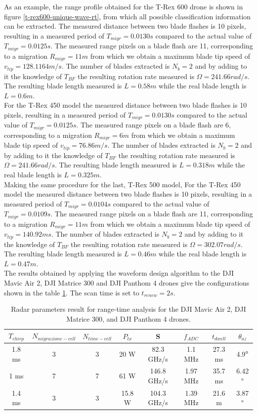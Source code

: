 As an example, the range profile obtained for the T-Rex 600 drone is shown in figure \ref{t-rex600-unique-wave-rt}, from which all possible classification information can be extracted. The measured distance between two blade flashes is 10 pixels, resulting in a measured period of $T_{migr} = 0.0130s$ compared to the actual value of $T_{migr} = 0.0125s$. The measured range pixels on a blade flash are 11, corresponding to a migration $R_{migr}=11m$ from which we obtain a maximum blade tip speed of $v_{tip} = 128.1164 m/s$. The  number of blades extracted is $N_b = 2$ and by adding to it the knowledge of $T_{BF}$ the resulting rotation rate measured is $\Omega = 241.66 rad/s$. The resulting blade length measured is $L = 0.58 m$ while the real blade length is $ L = 0.6 m$. \\
For the T-Rex 450 model the measured distance between two blade flashes is 10 pixels, resulting in a measured period of $T_{migr} = 0.0130s$ compared to the actual value of $T_{migr} = 0.0125s$. The measured range pixels on a blade flash are 6, corresponding to a migration $R_{migr}=6m$ from which we obtain a maximum blade tip speed of $v_{tip} = 76.86 m/s$. The  number of blades extracted is $N_b = 2$ and by adding to it the knowledge of $T_{BF}$ the resulting rotation rate measured is $\Omega = 241.66 rad/s$. The resulting blade length measured is $L = 0.318 m$ while the real blade length is $ L = 0.325 m$.\\
Making the same procedure for the last, T-Rex 500 model, For the T-Rex 450 model the measured distance between two blade flashes is 10 pixels, resulting in a measured period of $T_{migr} = 0.0104s$ compared to the actual value of $T_{migr} = 0.0109s$. The measured range pixels on a blade flash are 11, corresponding to a migration $R_{migr}=11m$ from which we obtain a maximum blade tip speed of $v_{tip} = 140.92 ms$. The  number of blades extracted is $N_b = 2$ and by adding to it the knowledge of $T_{BF}$ the resulting rotation rate measured is $\Omega = 302.07 rad/s$. The resulting blade length measured is $L = 0.46 m$ while the real blade length is $ L = 0.47 m$.\\
The results obtained by applying the waveform design algorithm to the DJI Mavic Air 2, DJI Matrice 300 and DJI Panthom 4 drones give the configurations shown in the table \ref{tab:rt-quad-result}. The scan time is set to $t_{renew} = 2s$.
\begin{table}[h!]
\centering
\begin{tabular}{|c|c|c|c|c|c|c|c|}
\hline
$T_{chirp}$ & $N_{migrazione-cell}$ & $N_{time-cell}$ & $P_{tx}$ & S & $f_{ADC}$ & $t_{dwell}$ & $\theta_{az}$ \\ \hline
1.8 ms & 3 & 3 & 20 W & 82.3 GHz/s & 1.1 MHz & 27.3 ms & 4.9$\degree$ \\ \hline
1 ms & 7 & 7 & 61 W & 146.8 GHz/s & 1.97 MHz & 35.7 ms & 6.42$\degree$ \\ \hline
1.4 ms & 3 & 3 & 15.8 W & 104.3 GHz/s & 1.39 MHz & 21.6 m & 3.87$\degree$ \\ \hline
\end{tabular}
\caption{Radar parameters result for range-time analysis for the DJI Mavic Air 2, DJI Matrice 300, and DJI Panthom 4 drones.}
\label{tab:rt-quad-result}
\end{table}
